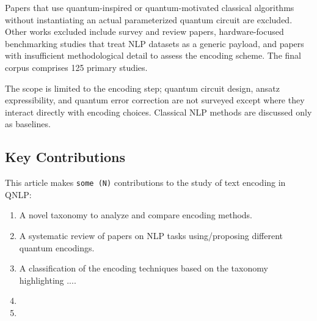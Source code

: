 \documentclass{ieeeaccess}
\begin{document}
Papers that use quantum-inspired or quantum-motivated classical algorithms without instantiating an actual parameterized quantum circuit are excluded. Other works excluded include survey and review papers, hardware-focused benchmarking studies that treat NLP datasets as a generic payload, and papers with insufficient methodological detail to assess the encoding scheme. The final corpus comprises 125 primary studies.

The scope is limited to the encoding step; quantum circuit design, ansatz expressibility, and quantum error correction are not surveyed except where they interact directly with encoding choices. Classical NLP methods are discussed only as baselines.

\subsection{Key Contributions}
This article makes \texttt{some (N)} contributions to the study of text encoding in QNLP: 
\begin{enumerate}
\item[1)] A novel taxonomy to analyze and compare encoding methods.  
\item[2)] A systematic review of papers on NLP tasks using/proposing different quantum encodings.
\item[3)] A classification of the encoding techniques based on the taxonomy highlighting ....
\item[4)]
\item[5)]
\end{enumerate}
\end{document}
